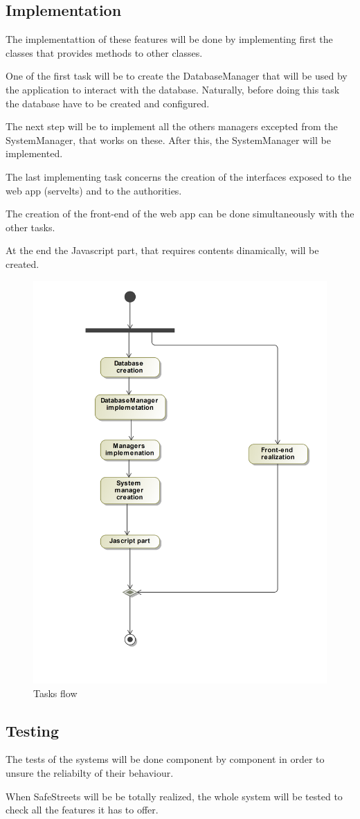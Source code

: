 \subsection{Implementation}
The implementattion of these features will be done by implementing first the classes that provides methods to other classes.

One of the first task will be to create the DatabaseManager that will be used by the application to interact with the database. 
Naturally, before doing this task the database  have to be created and configured.

The next step will be to implement all the others managers excepted from the SystemManager, that works on these.
After this, the SystemManager will be implemented. 

The last implementing task concerns the creation of the interfaces exposed to the web app (servelts) and to the authorities.

The creation of the front-end of the web app can be done simultaneously with the other tasks.

At the end the Javascript part, that requires contents dinamically, will be created.
\begin{figure}
	\centering
	\includegraphics[width=0.7\linewidth]{Images/Tasks}
	\caption{Tasks flow}
	\label{Tasks flow}
\end{figure}

\subsection{Testing}

The tests of the systems will be done component by component in order to unsure the reliabilty of their behaviour.

When SafeStreets will be be totally realized, the whole system will be tested to check all the features it has to offer.

